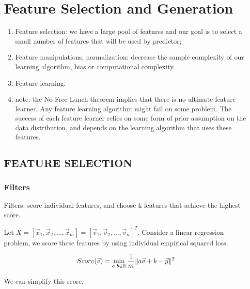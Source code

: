 
\section{Feature Selection and Generation}%
\label{sec:feature_selection_and_generation}

\begin{enumerate}
    \item Feature selection: we have a large pool of features and our goal is to select a small number of features that will be used by predictor;
    \item Feature manipulations, normalization: decrease the sample complexity of our learning algorithm, bias or computational complexity.
    \item Feature learning.
    \item note: the {No-Free-Lunch} theorem implies that there is no ultimate feature learner. Any feature learning algorithm might fail on some problem. The success of each feature learner relies on some form of prior assumption on the data distribution, and depends on the learning algorithm that uses these features.
\end{enumerate}

\subsection{FEATURE SELECTION}%
\label{sub:feature_selection}

\subsubsection{Filters}%

Filters: score individual features, and choose k features that achieve the highest score.

Let $ X = \left[ \vec{x}_1, \vec{x}_2, \ldots, \vec{x}_m \right] = {\left[ \vec{v}_1, \vec{v}_2, \ldots, \vec{v}_n \right]}^T $.
Consider a linear regression problem, we score these features by using individual empirical squared loss.

\[
    Score(\vec{v}) = \min_{a, b \in \mathbb{R}} \frac{1}{m} \Arrowvert a \vec{v} + b - \vec{y} \Arrowvert^2 
\]

We can simplify this score.

